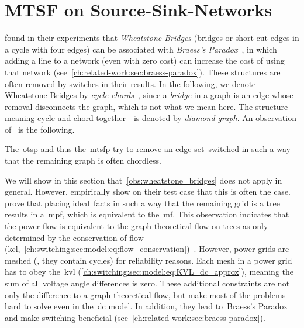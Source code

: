 % 
\section{MTSF on Source-Sink-Networks}
\label{ch:switching:sec:exploit_structural_characteristics}
%
\textcite{Fis08} found in their experiments that \emph{Wheatstone Bridges}
\parencite{905717} (bridges or short-cut edges in a cycle with four edges) can
be associated with \emph{Braess's Paradox}~\parencite{Bra05,Pal12,Nag10}, in
which adding a line to a network (even with zero cost) can increase the cost of
using that network
(see~\cref{ch:related-work:sec:braess-paradox}).
These structures are often removed by switches in their results. In the
following, we denote Wheatstone Bridges by
%
\emph{cycle
chords}~\parencite[p.~225]{online:ISGCI:Information_System_on_Graph_Class_Inclusions:V2_0,west_introduction_2000},
since a \emph{bridge} in a graph is an edge whose removal disconnects the graph,
which is not what we mean here.
%
The structure---meaning cycle and chord together---is denoted by \emph{diamond
graph}. An observation of~\textcite{Fis08} is the following.
%
\begin{observation}
    The~\gls{otsp} and thus the~\gls{mtsfp} try to remove an edge
    set~\gls{switched} in such a way that the remaining graph is often
    chordless.
    \label{obs:wheatstone_bridges}
\end{observation}
%
We will show in this section that~\cref{obs:wheatstone_bridges} does not apply
in general. However, \textcite{Fis08} empirically show on their test case that
this is often the case. \textcite{Lei15b} prove that placing ideal~\gls{facts}
in such a way that the remaining grid is a tree results in a~\gls{mpf}, which is
equivalent to the~\gls{mf}. This observation indicates that the power flow is
equivalent to the graph theoretical flow on trees as only determined by the
conservation of flow
(\gls{kcl},~\cref{ch:switching:sec:model:eq:flow_conservation})~\parencite[see][Lemma~4]{Leh15a}.
However, power grids are meshed (\ie, they contain cycles) for reliability
reasons. Each mesh in a power grid has to obey the~\gls{kvl}
(\cref{ch:switching:sec:model:eq:KVL_dc_approx}), meaning the sum of all voltage
angle differences is zero. These additional constraints are not only the
difference to a graph-theoretical flow, but make most of the problems hard to
solve even in the~\gls{dc} model. In addition, they lead to~Braess's Paradox and
make switching beneficial
(see~\cref{ch:related-work:sec:braess-paradox}).

